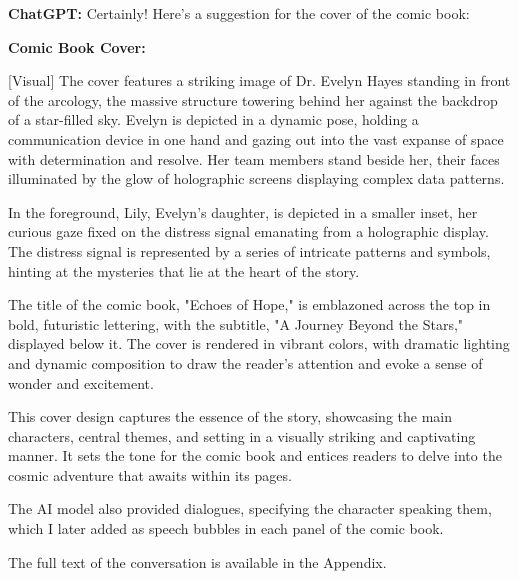 \documentclass[a4paper,11pt]{article}
\newenvironment{shadedquotation1}
    {\colorlet{shadecolor}{JungleGreen!15}\begin{shaded*}
    \quoting[leftmargin=0cm, rightmargin=0cm, vskip=0pt]
    }
    {\endquoting
    \end{shaded*}
}
\begin{document}
\begin{shadedquotation1}
    \noindent\textbf{ChatGPT:} Certainly! Here's a suggestion for the cover of the comic book:\medskip

    \noindent\textbf{Comic Book Cover:}\smallskip
    
    [Visual] The cover features a striking image of Dr. Evelyn Hayes standing in front of the arcology, the massive structure towering behind her against the backdrop of a star-filled sky. Evelyn is depicted in a dynamic pose, holding a communication device in one hand and gazing out into the vast expanse of space with determination and resolve. Her team members stand beside her, their faces illuminated by the glow of holographic screens displaying complex data patterns.
    
    In the foreground, Lily, Evelyn's daughter, is depicted in a smaller inset, her curious gaze fixed on the distress signal emanating from a holographic display. The distress signal is represented by a series of intricate patterns and symbols, hinting at the mysteries that lie at the heart of the story.
    
    The title of the comic book, "Echoes of Hope," is emblazoned across the top in bold, futuristic lettering, with the subtitle, "A Journey Beyond the Stars," displayed below it. The cover is rendered in vibrant colors, with dramatic lighting and dynamic composition to draw the reader's attention and evoke a sense of wonder and excitement.\medskip
    
    This cover design captures the essence of the story, showcasing the main characters, central themes, and setting in a visually striking and captivating manner. It sets the tone for the comic book and entices readers to delve into the cosmic adventure that awaits within its pages.
\end{shadedquotation1}

The AI model also provided dialogues, specifying the character speaking them, which I later added as speech bubbles in each panel of the comic book.\medskip

The full text of the conversation is available in the Appendix.
\end{document}
